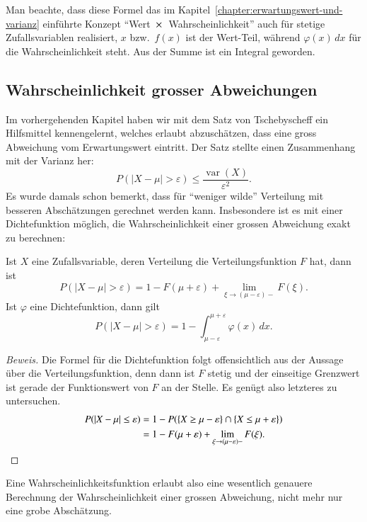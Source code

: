 Man beachte, dass diese Formel das im
Kapitel~\ref{chapter:erwartungswert-und-varianz} einführte Konzept
``Wert $\mathstrut \times\mathstrut $ Wahrscheinlichkeit''
auch für stetige Zufallsvariablen realisiert, $x$ bzw.~$f(x)$ ist
der Wert-Teil, während $\varphi(x)\,dx$ für die Wahrscheinlichkeit
steht.
Aus der Summe ist ein Integral geworden.

\subsection{Wahrscheinlichkeit grosser Abweichungen}
Im vorhergehenden Kapitel haben wir mit dem Satz von Tschebyscheff ein
Hilfsmittel kennengelernt, welches erlaubt abzuschätzen, dass eine
gross Abweichung vom Erwartungswert eintritt.
Der Satz stellte einen
Zusammenhang mit der Varianz her:
\[
P(|X-\mu|>\varepsilon)\le\frac{\operatorname{var}(X)}{\varepsilon^2}.
\]
Es wurde damals schon bemerkt, dass für ``weniger wilde'' Verteilung mit
besseren Abschätzungen gerechnet werden kann.
Insbesondere ist es mit
einer Dichtefunktion möglich, die Wahrscheinlichkeit einer grossen
Abweichung exakt zu berechnen:
\begin{satz} Ist $X$ eine Zufallsvariable, deren Verteilung die
Verteilungsfunktion $F$ hat, dann ist
\[
P(|X-\mu|>\varepsilon)=
1-F(\mu+\varepsilon)+\lim_{\xi\to (\mu-\varepsilon)-}F(\xi).
\]
Ist $\varphi$ eine Dichtefunktion, dann gilt
\[
P(|X-\mu|>\varepsilon)=1-\int_{\mu-\varepsilon}^{\mu+\varepsilon}\varphi(x)\,dx.
\]
\end{satz}
\begin{proof}[Beweis]Die Formel für die Dichtefunktion folgt offensichtlich
aus der Aussage über die Verteilungsfunktion, denn dann ist $F$ stetig
und der einseitige Grenzwert ist gerade der Funktionswert von $F$ an der
Stelle.
Es genügt also letzteres
zu untersuchen.
\begin{align*}
P(|X-\mu|\le\varepsilon)
&=1-P(\{X\ge\mu-\varepsilon\}\cap\{X\le\mu+\varepsilon\})\\
&=1-F(\mu+\varepsilon)+\lim_{\xi\to (\mu-\varepsilon)-}F(\xi).
\qedhere
\end{align*}
\end{proof}
Eine Wahrscheinlichkeitsfunktion erlaubt also eine wesentlich
genauere Berechnung der Wahrscheinlichkeit einer grossen Abweichung,
nicht mehr nur eine grobe Abschätzung.

